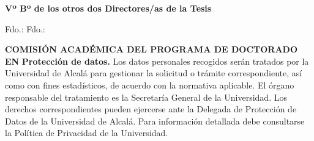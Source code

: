 \documentclass[11pt,a4paper,oneside]{article}
\begin{document}
\vspace{0.5cm}
\noindent\textbf{Vº Bº de los otros dos Directores/as de la Tesis}\par
\vspace{1.5cm}
Fdo.: \myAcademicTutorFullName \hfill Fdo.: \myCoTutorFullName

\vspace{0.5cm}\noindent\textbf{COMISIÓN ACADÉMICA DEL PROGRAMA DE DOCTORADO EN \myPhDProgram}
\vfill
{\scriptsize
\noindent\textbf{Protección de datos.} Los datos personales recogidos serán tratados por la Universidad de Alcalá para gestionar la solicitud o trámite correspondiente, así como con fines estadísticos, de acuerdo con la normativa aplicable. El órgano responsable del tratamiento es la Secretaría General de la Universidad. Los derechos correspondientes pueden ejercerse ante la Delegada de Protección de Datos de la Universidad de Alcalá. Para información detallada debe consultarse la Política de Privacidad de la Universidad.
}
\end{document}
